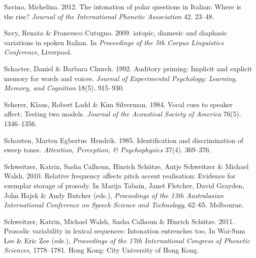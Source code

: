 \documentclass[ number=1
,series=labphon
,output=long
,url=http://langsci-press.org/catalog/book/16
,isbn=978-3-944675-01-5
]{LSP/langsci}
\begin{document}
\begin{thebibliography}{284}
Savino, Michelina. 2012.
\newblock The intonation of polar questions in {I}talian: {W}here is the rise?
\newblock \emph{Journal of the International Phonetic Association} 42. 23--48.

Savy, Renata \& Francesco Cutugno. 2009.
iatopic, diamesic and diaphasic variations in spoken
  {I}talian.
\newblock In \emph{Proceedings of the 5th {Corpus Linguistics Conference}},
  Liverpool.

Schacter, Daniel \& Barbara Church. 1992.
\newblock Auditory priming: {I}mplicit and explicit memory for words and
  voices.
\newblock \emph{Journal of Experimental Psychology: Learning, Memory, and
  Cognition} 18(5). 915--930.

Scherer, Klaus, Robert Ladd \& Kim Silverman. 1984.
\newblock Vocal cues to speaker affect: {T}esting two models.
\newblock \emph{Journal of the Acoustical Society of America} 76(5).
  1346--1356.

Schouten, Marten Egbertus~Hendrik. 1985.
\newblock Identification and discrimination of sweep tones.
\newblock \emph{Attention, Perception, \& Psychophysics} 37(4). 369--376.

\enlargethispage{\baselineskip}
Schweitzer, Katrin, Sasha Calhoun, Hinrich Sch{\"u}tze, Antje Schweitzer \&
  Michael Walsh. 2010{}.
\newblock Relative frequency affects pitch accent realisation: {E}vidence for
  exemplar storage of prosody.
\newblock In Marija Tabain, Janet Fletcher, David Grayden, John Hajek \& Andy
  Butcher (eds.), \emph{Proceedings of the 13th {Australasian International
  Conference on Speech Science and Technology}}, 62--65. Melbourne.

Schweitzer, Katrin, Michael Walsh, Sasha Calhoun \& Hinrich Sch{\"u}tze. 2011.
\newblock Prosodic variability in lexical sequences: {I}ntonation entrenches
  too.
\newblock In Wai-Sum Lee \& Eric Zee (eds.), \emph{Proceedings of the 17th
  {I}nternational {C}ongress of {P}honetic {S}ciences}, 1778--1781. Hong Kong:
  City University of Hong Kong.


\end{thebibliography}
\end{document}
